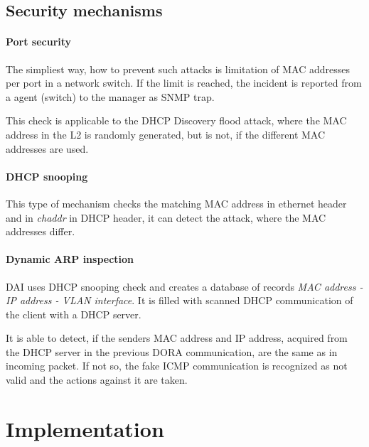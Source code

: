 \documentclass[10pt,a4paper,titlepage]{article}
\begin{document}
\subsection*{Security mechanisms}

\paragraph{Port security}
The simpliest way, how to prevent such attacks is limitation of MAC addresses
per port in a network switch. If the limit is reached, the incident is reported
from a agent (switch) to the manager as SNMP trap.

This check is applicable to the DHCP Discovery flood attack, where the MAC address
in the L2 is randomly generated, but is not, if the different MAC addresses are used.

\paragraph{DHCP snooping}
This type of mechanism checks the matching MAC address in ethernet header
and in {\it chaddr} in DHCP header, it can detect the attack, where the MAC
addresses differ.

\paragraph{Dynamic ARP inspection}
DAI uses DHCP snooping check and creates a database of records {\it MAC address
- IP address - VLAN interface}. It is filled with scanned DHCP communication
of the client with a DHCP server.

It is able to detect, if the senders MAC address and IP address, acquired from
the DHCP server in the previous DORA communication, are the same as in
incoming packet. If not so, the fake ICMP communication is recognized as not
valid and the actions against it are taken. \cite{DHCPstarvation}


\section*{Implementation}
\end{document}
